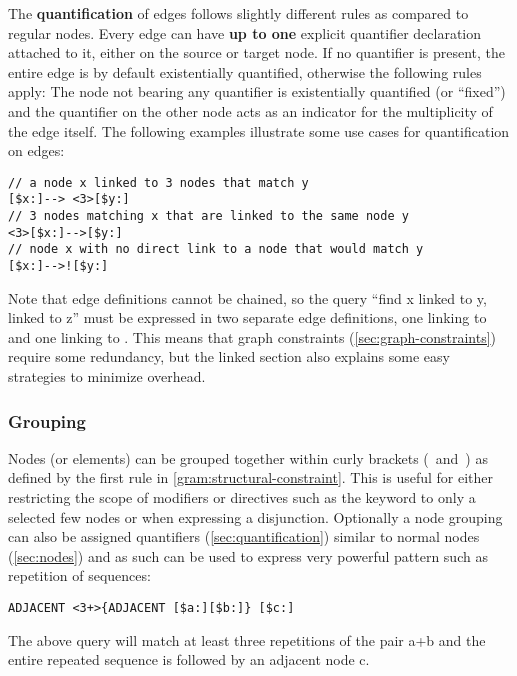 \documentclass[11pt,a4paper]{report}
\begin{document}
The \textbf{quantification} of edges follows slightly different rules as compared to regular nodes.
Every edge can have \textbf{up to one} explicit quantifier declaration attached to it, either on the source or target node.
If no quantifier is present, the entire edge is by default existentially quantified, otherwise the following rules apply:
The node not bearing any quantifier is existentially quantified (or ``fixed'') and the quantifier on the other node acts as an indicator for the multiplicity of the edge itself.
The following examples illustrate some use cases for quantification on edges:

\begin{Verbatim}[samepage=true]
// a node x linked to 3 nodes that match y
[$x:]--> <3>[$y:]
// 3 nodes matching x that are linked to the same node y   
<3>[$x:]-->[$y:]
// node x with no direct link to a node that would match y
[$x:]-->![$y:]
\end{Verbatim}

Note that edge definitions cannot be chained, so the query ``find x linked to y, linked to z'' must be expressed in two separate edge definitions, one linking  to  and one linking  to .
This means that graph constraints (\ref{sec:graph-constraints}) require some redundancy, but the linked section also explains some easy strategies to minimize overhead.

\subsubsection{Grouping}
\label{sec:node-grouping}
Nodes (or elements) can be grouped together within curly brackets (\lit{\{}~and~\lit{\}}) as defined by the first  rule in \cref{gram:structural-constraint}.
This is useful for either restricting the scope of modifiers or directives such as the  keyword to only a selected few nodes or when expressing a disjunction.
Optionally a node grouping can also be assigned quantifiers (\ref{sec:quantification}) similar to normal nodes (\ref{sec:nodes}) and as such can be used to express very powerful pattern such as repetition of sequences:
\begin{Verbatim}[samepage=true]
ADJACENT <3+>{ADJACENT [$a:][$b:]} [$c:]
\end{Verbatim}
The above query will match at least three repetitions of the pair a+b and the entire repeated sequence is followed by an adjacent node c.
\end{document}
